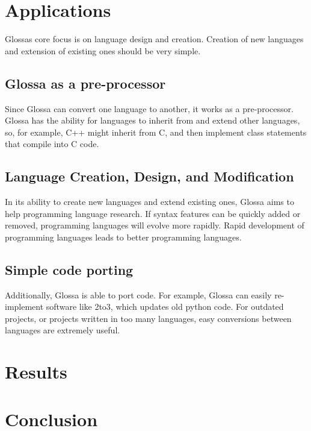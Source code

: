 \documentclass{article}
\begin{document}
\section{Applications}

Glossas core focus is on language design and creation. Creation of new languages and extension of existing ones should be very simple. 

\subsection{Glossa as a pre-processor}

Since Glossa can convert one language to another, it works as a pre-processor.
Glossa has the ability for languages to inherit from and extend other languages, so, for example, C++ might inherit from C, and then implement class statements that compile into C code.

\subsection{Language Creation, Design, and Modification}

In its ability to create new languages and extend existing ones, Glossa aims to help programming language research.
If syntax features can be quickly added or removed, programming languages will evolve more rapidly.
Rapid development of programming languages leads to better programming languages.

\subsection{Simple code porting}

Additionally, Glossa is able to port code. For example, Glossa can easily re-implement software like 2to3, which updates old python code.
For outdated projects, or projects written in too many languages, easy conversions between languages are extremely useful.

\section{Results}

\section{Conclusion}
\end{document}
